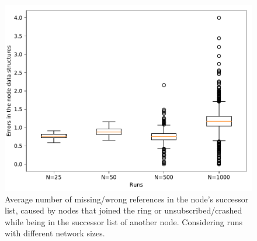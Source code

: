 \documentclass[11pt,twocolumn,letterpaper]{article}
\begin{document}
	\begin{figure}[!ht]
		\centering
		\includegraphics[width=\linewidth,clip,trim=0 0.5cm 0 0.35cm]{figures/analysis2/errors_box.pdf}
		\caption{Average number of missing/wrong references in the node's successor list, caused by nodes that joined the ring or unsubscribed/crashed while being in the successor list of another node. Considering runs with different network sizes.}
		\label{fig:netsize2}
	\end{figure}	
		
\end{document}
